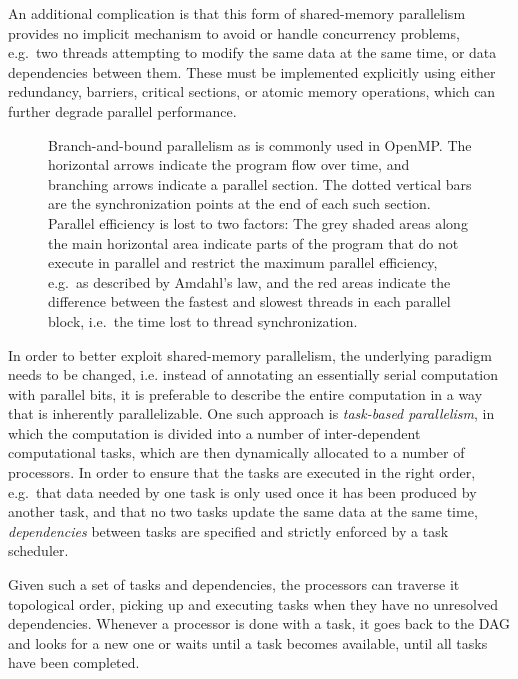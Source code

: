 \documentclass[final]{siamltex}
\begin{document}
An additional complication is that this form of shared-memory
parallelism provides no implicit mechanism to avoid or handle
concurrency problems,
e.g.~two threads attempting to modify the same data at the same time,
or data dependencies between them.
These must be implemented explicitly using either redundancy, barriers,
critical sections, or atomic memory operations, which can further degrade
parallel performance.

\begin{figure}
    \centerline{}
    
    \caption{Branch-and-bound parallelism as is commonly used in OpenMP.
        The horizontal arrows indicate the program flow over time, and
        branching arrows indicate a parallel section. The dotted vertical
        bars are the synchronization points at the end of each such section.
        Parallel efficiency is lost to two factors: The grey shaded areas
        along the main horizontal area indicate parts of the program that
        do not execute in parallel and restrict the maximum parallel
        efficiency, e.g.~as described by Amdahl's law, and the red
        areas indicate the difference between the fastest and slowest
        threads in each parallel block, i.e.~the time lost to
        thread synchronization.
        }
    \label{fig:OMPScaling}
\end{figure}


In order to better exploit shared-memory parallelism, 
the underlying paradigm needs to be changed, i.e. instead
of annotating an essentially serial computation with parallel
bits, it is preferable to describe the entire computation in a way that
is inherently parallelizable.
One such approach is {\em task-based parallelism}, in which the
computation is divided into a number of inter-dependent
computational tasks, which are then dynamically allocated
to a number of processors.
In order to ensure that the tasks are executed in the right
order, e.g.~that data needed by one task is only used once it
has been produced by another task, and that no two tasks
update the same data at the same time, {\em dependencies} between
tasks are specified and strictly enforced by a task scheduler.

Given such a set of tasks and dependencies, the processors
can traverse it topological order, picking up and executing
tasks when they have no unresolved dependencies.
Whenever a processor is done with a task, it goes back to
the DAG and looks for a new one or waits until a task
becomes available, until all tasks have been completed.
\end{document}

